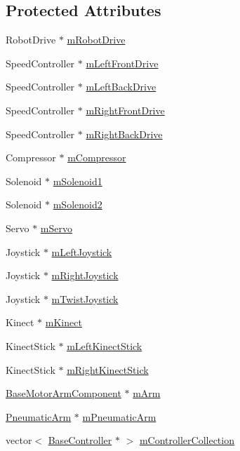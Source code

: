 \subsection*{\-Protected \-Attributes}
\begin{DoxyCompactItemize}
\item 
\-Robot\-Drive $\ast$ \hyperlink{class_prototype_robot_a59ebd43c14b20ccc1d8bbdd36903ae6a}{m\-Robot\-Drive}
\item 
\-Speed\-Controller $\ast$ \hyperlink{class_prototype_robot_aa528a979ca0417689b689a5b8de5760c}{m\-Left\-Front\-Drive}
\item 
\-Speed\-Controller $\ast$ \hyperlink{class_prototype_robot_acf1e651f477389c17bd0c78a0f80237b}{m\-Left\-Back\-Drive}
\item 
\-Speed\-Controller $\ast$ \hyperlink{class_prototype_robot_a00cbde5b429dca9a0f2d1493b4a5b0b7}{m\-Right\-Front\-Drive}
\item 
\-Speed\-Controller $\ast$ \hyperlink{class_prototype_robot_a07872d55928f02046bbca01674ae1192}{m\-Right\-Back\-Drive}
\item 
\-Compressor $\ast$ \hyperlink{class_prototype_robot_a5478de9598e5f16cc8f74f60cf854152}{m\-Compressor}
\item 
\-Solenoid $\ast$ \hyperlink{class_prototype_robot_a796da143a2bb4f066d02a917e07b51cb}{m\-Solenoid1}
\item 
\-Solenoid $\ast$ \hyperlink{class_prototype_robot_a09a513e0fc667b2b63156caece8dcab0}{m\-Solenoid2}
\item 
\-Servo $\ast$ \hyperlink{class_prototype_robot_aa4594d0971bd4533ff0eb4e03a691819}{m\-Servo}
\item 
\-Joystick $\ast$ \hyperlink{class_prototype_robot_a4b1666c78ec45587e5468a9e37fea463}{m\-Left\-Joystick}
\item 
\-Joystick $\ast$ \hyperlink{class_prototype_robot_adba5da50eb59a9a4bf87cd91523b3b38}{m\-Right\-Joystick}
\item 
\-Joystick $\ast$ \hyperlink{class_prototype_robot_a34901bc0b6099bf65cb29ab819487a4b}{m\-Twist\-Joystick}
\item 
\-Kinect $\ast$ \hyperlink{class_prototype_robot_adaab5819787642c2204e6f26f84c1871}{m\-Kinect}
\item 
\-Kinect\-Stick $\ast$ \hyperlink{class_prototype_robot_a50e2be321cba606ee93ae8aca7cf513c}{m\-Left\-Kinect\-Stick}
\item 
\-Kinect\-Stick $\ast$ \hyperlink{class_prototype_robot_aee80524be604111679af71811c1dcb79}{m\-Right\-Kinect\-Stick}
\item 
\hyperlink{class_base_motor_arm_component}{\-Base\-Motor\-Arm\-Component} $\ast$ \hyperlink{class_prototype_robot_a36d9223bd2fe9e9b657f6752ec2fbe94}{m\-Arm}
\item 
\hyperlink{class_pneumatic_arm}{\-Pneumatic\-Arm} $\ast$ \hyperlink{class_prototype_robot_a7faff555689ab1768c5bd8b2f78fe029}{m\-Pneumatic\-Arm}
\item 
vector$<$ \hyperlink{class_base_controller}{\-Base\-Controller} $\ast$ $>$ \hyperlink{class_prototype_robot_a0ea7c8c7d32f9a237bd0dbb559c27dc2}{m\-Controller\-Collection}
\end{DoxyCompactItemize}
